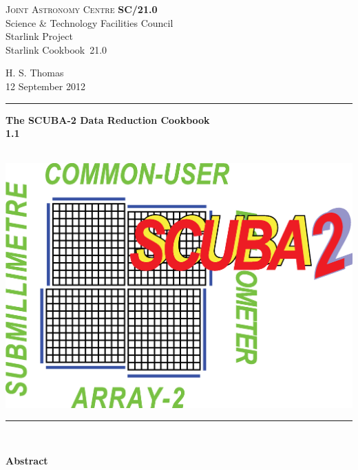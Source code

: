 \documentclass[twoside,11pt]{article}
\newcommand{\stardoccategory}  {Starlink Cookbook}
\newcommand{\stardocinitials}  {SC}
\newcommand{\stardocnumber}    {21.0}
\newcommand{\stardocauthors}   {H. S. Thomas}
\newcommand{\stardocdate}      {12 September 2012}
\newcommand{\stardoctitle}     {The SCUBA-2 Data Reduction Cookbook}
\newcommand{\stardocversion}   {1.1}
\newcommand{\stardocmanual}    {\ }
\newcommand{\stardocname}{\stardocinitials /\stardocnumber}
\newenvironment{latexonly}{}{}
\renewcommand{\_}{\texttt{\symbol{95}}}
\begin{document}
\thispagestyle{empty}

\begin{latexonly}
   \textsc{Joint Astronomy Centre} \hfill \textbf{\stardocname}\\
   {\large Science \& Technology Facilities Council}\\
   {\large Starlink Project\\}
   {\large \stardoccategory\ \stardocnumber}
   \begin{flushright}
   \stardocauthors\\
   \stardocdate
   \end{flushright}
   \vspace{-4mm}
   \rule{\textwidth}{0.5mm}
   \vspace{5mm}
   \begin{center}
   {\Huge\textbf{\stardoctitle \\ [2.5ex]}}
   {\LARGE\textbf{\stardocversion \\ [4ex]}}
   {\Huge\textbf{\stardocmanual}}
   \end{center}
   \vspace{5mm}

   \begin{center}
   \includegraphics[scale=0.4]{sc21_s2logo.eps}
   \end{center}
   \vspace{5mm}
   \rule{\textwidth}{0.5mm}\\
   \vspace{15mm}

   \vspace{10mm}
   \begin{center}
      {\Large\textbf{Abstract}}
   \end{center}
\end{latexonly}
\end{document}
